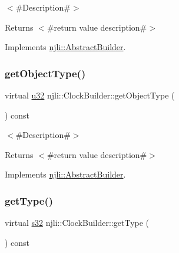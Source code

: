 $<$\#\+Description\#$>$

\begin{DoxyReturn}{Returns}
$<$\#return value description\#$>$ 
\end{DoxyReturn}


Implements \mbox{\hyperlink{classnjli_1_1_abstract_builder_a902f73ea78031b06aca183a417f3413b}{njli\+::\+Abstract\+Builder}}.

\mbox{\label{classnjli_1_1_clock_builder_a3de46a7a2e9760dc67486462bebf0790}} 
\subsubsection{\texorpdfstring{get\+Object\+Type()}{getObjectType()}}
{\footnotesize\ttfamily virtual \mbox{\hyperlink{_util_8h_a10e94b422ef0c20dcdec20d31a1f5049}{u32}} njli\+::\+Clock\+Builder\+::get\+Object\+Type (\begin{DoxyParamCaption}{ }\end{DoxyParamCaption}) const\hspace{0.3cm}{\ttfamily [virtual]}}

$<$\#\+Description\#$>$

\begin{DoxyReturn}{Returns}
$<$\#return value description\#$>$ 
\end{DoxyReturn}


Implements \mbox{\hyperlink{classnjli_1_1_abstract_builder_a0f2d344fcf697b167f4f2b1122b5fb33}{njli\+::\+Abstract\+Builder}}.

\mbox{\label{classnjli_1_1_clock_builder_aa1d909c599d2fbc6106b417e6b623f9f}} 
\subsubsection{\texorpdfstring{get\+Type()}{getType()}}
{\footnotesize\ttfamily virtual \mbox{\hyperlink{_util_8h_aa62c75d314a0d1f37f79c4b73b2292e2}{s32}} njli\+::\+Clock\+Builder\+::get\+Type (\begin{DoxyParamCaption}{ }\end{DoxyParamCaption}) const\hspace{0.3cm}{\ttfamily [virtual]}}

